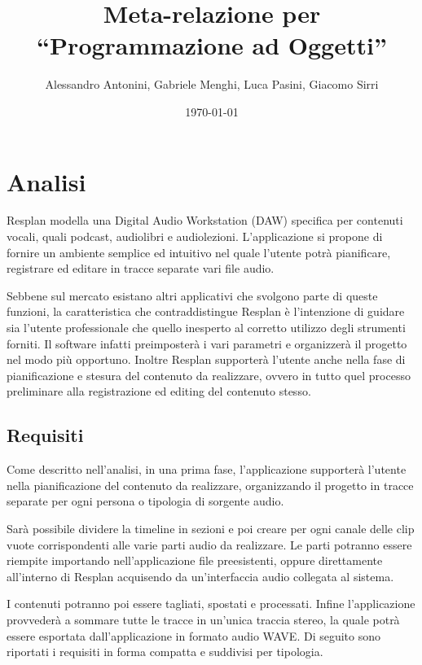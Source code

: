 \documentclass[a4paper,12pt]{report}
\title{Meta-relazione per\\``Programmazione ad Oggetti''}
\author{Alessandro Antonini, Gabriele Menghi, Luca Pasini, Giacomo Sirri}
\date{\today}
\begin{document}
\maketitle

\tableofcontents

\chapter{Analisi}

Resplan modella una Digital Audio Workstation (DAW) specifica per contenuti vocali, quali podcast, audiolibri e audiolezioni.
L’applicazione si propone di fornire un ambiente semplice ed intuitivo nel quale l’utente potrà pianificare, registrare ed editare in tracce separate vari file audio.

Sebbene sul mercato esistano altri applicativi che svolgono parte di queste funzioni, la caratteristica che contraddistingue Resplan è l’intenzione di guidare sia l’utente professionale che quello inesperto al corretto utilizzo degli strumenti forniti. Il software infatti preimposterà i vari parametri e organizzerà il progetto nel modo più opportuno. Inoltre Resplan supporterà l’utente anche nella fase di pianificazione e stesura del contenuto da realizzare, ovvero in tutto quel processo preliminare alla registrazione ed editing del contenuto stesso.


\section{Requisiti}

Come descritto nell’analisi, in una prima fase, l’applicazione supporterà l’utente nella pianificazione del contenuto da realizzare, organizzando il progetto in tracce separate per ogni persona o tipologia di sorgente audio.

Sarà possibile dividere la timeline in sezioni e poi creare per ogni canale delle clip vuote corrispondenti alle varie parti audio da realizzare.
Le parti potranno essere riempite importando nell’applicazione file preesistenti, oppure direttamente all’interno di Resplan acquisendo da un'interfaccia audio collegata al sistema.

I contenuti potranno poi essere tagliati, spostati e processati.
Infine l’applicazione provvederà a sommare tutte le tracce in un’unica traccia stereo, la quale potrà essere esportata dall’applicazione in formato audio WAVE.
Di seguito sono riportati i requisiti in forma compatta e suddivisi per tipologia.
\end{document}
